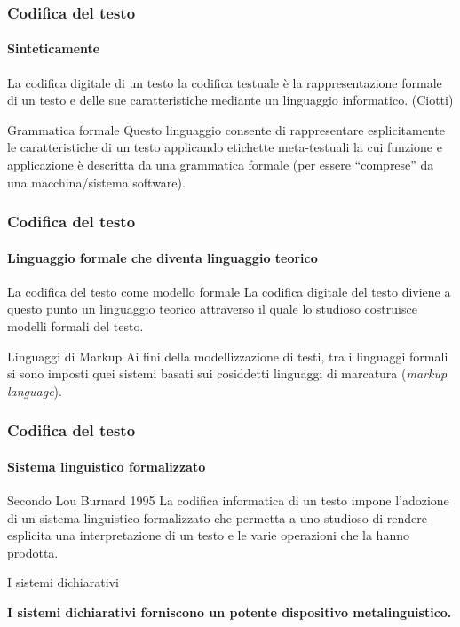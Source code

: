 \begin{frame}
	\frametitle{Codifica del testo}
	\framesubtitle{Sinteticamente}
	\addtocounter{nframe}{1}

	\begin{block}{La codifica digitale di un testo}
		la codifica testuale è la rappresentazione formale di un testo e delle sue caratteristiche mediante un linguaggio informatico. (Ciotti)
	\end{block}

	\begin{block}{Grammatica formale}
		Questo linguaggio consente di rappresentare esplicitamente le caratteristiche di un testo applicando etichette meta-testuali la cui funzione e applicazione è descritta da una grammatica formale (per essere ``comprese'' da una macchina/sistema software).
	\end{block}
\end{frame}

\begin{frame}
	\frametitle{Codifica del testo}
	\framesubtitle{Linguaggio formale che diventa linguaggio teorico}
	\addtocounter{nframe}{1}

	\begin{block}{La codifica del testo come modello formale}
		La codifica digitale del testo diviene a questo punto un linguaggio teorico attraverso il quale lo studioso costruisce modelli formali del testo.
	\end{block}

	\begin{block}{Linguaggi di Markup}
		Ai fini della modellizzazione di testi, tra i linguaggi formali si sono imposti quei sistemi basati sui cosiddetti linguaggi di marcatura (\textit{markup language}).
	\end{block}
\end{frame}


\begin{frame}
	\frametitle{Codifica del testo}
	\framesubtitle{Sistema linguistico formalizzato}
	\addtocounter{nframe}{1}

	\begin{block}{Secondo Lou Burnard 1995}
		La codifica informatica di un testo impone l'adozione di un sistema linguistico formalizzato che permetta a uno studioso di rendere esplicita una interpretazione di un testo e le varie operazioni che la hanno prodotta.
	\end{block}

	\begin{block}{I sistemi dichiarativi}
		\begin{center}
			\textbf{I sistemi dichiarativi forniscono un potente dispositivo metalinguistico.}
		\end{center}
	\end{block}

\end{frame}

